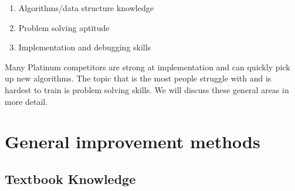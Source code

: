 \documentclass[11pt]{article} %
\begin{document}
\begin{enumerate}
\item Algorithms/data structure knowledge
\item Problem solving aptitude
\item Implementation and debugging skills
\end{enumerate}

Many Platinum competitors are strong at implementation and can quickly pick up new algorithms. The topic that is the most people struggle with and is hardest to train is problem solving skills. We will discuss these general areas in more detail.

\section{General improvement methods}

\subsection{Textbook Knowledge}
\end{document}
